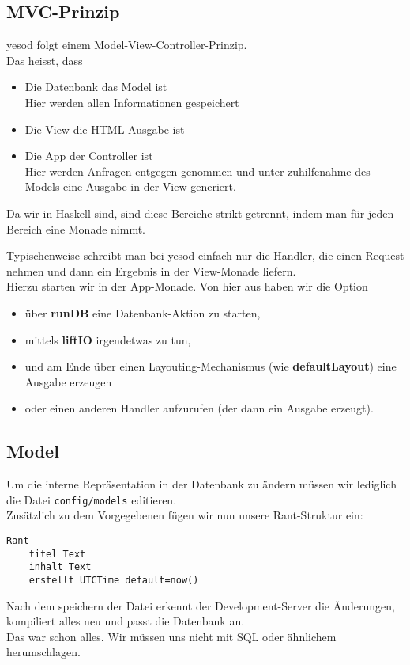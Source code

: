 \documentclass{beamer}
\begin{document}
\subsection{MVC-Prinzip}

\begin{frame}[fragile]
yesod folgt einem Model-View-Controller-Prinzip. \\\pause
Das heisst, dass
\begin{itemize}
 \item Die Datenbank das Model ist\\\pause
       Hier werden allen Informationen gespeichert
 \pause
 \item Die View die HTML-Ausgabe ist
 \pause
 \item Die App der Controller ist\\\pause
       Hier werden Anfragen entgegen genommen und unter zuhilfenahme des Models eine Ausgabe in der View generiert.
\end{itemize}
\pause
Da wir in Haskell sind, sind diese Bereiche strikt getrennt, indem man für jeden Bereich eine Monade nimmt.
\end{frame}

\begin{frame}[fragile]
Typischenweise schreibt man bei yesod einfach nur die Handler, die einen Request nehmen und dann ein Ergebnis in der View-Monade liefern.\\\pause
Hierzu starten wir in der \glqq App\grqq -Monade. Von hier aus haben wir die Option
\begin{itemize}
\pause
 \item über \textbf{runDB} eine Datenbank-Aktion zu starten,
\pause
 \item mittels \textbf{liftIO} irgendetwas zu tun,
\pause
 \item und am Ende über einen Layouting-Mechanismus (wie \textbf{defaultLayout}) eine Ausgabe erzeugen
\pause
 \item oder einen anderen Handler aufzurufen (der dann ein Ausgabe erzeugt).
\end{itemize}
\end{frame}



\subsection{Model}

\begin{frame}[fragile]
Um die interne Repräsentation in der Datenbank zu ändern müssen wir lediglich die Datei \texttt{config/models} editieren. \\\pause
Zusätzlich zu dem Vorgegebenen fügen wir nun unsere Rant-Struktur ein:
\begin{verbatim}
Rant
    titel Text
    inhalt Text
    erstellt UTCTime default=now()
\end{verbatim}
\pause
Nach dem speichern der Datei erkennt der Development-Server die Änderungen, kompiliert alles neu und passt die Datenbank an.\\\pause
Das war schon alles. Wir müssen uns nicht mit SQL oder ähnlichem herumschlagen.
\end{frame}
\end{document}
